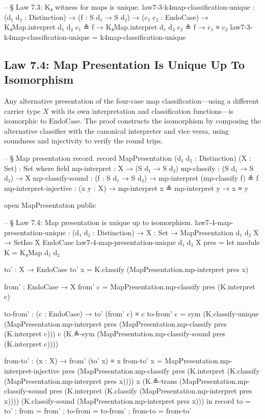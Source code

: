 \documentclass[11pt,a4paper]{book}
\def\texttt#1{#1}%
\begin{document}
\begin{code}
-- § Law 7.3: K₄ witness for maps is unique.
law7-3-k4map-classification-unique :
  (d₁ d₂ : Distinction) →
  (f : S d₁ → S d₂) →
  (c₁ c₂ : EndoCase) →
  K₄Map.interpret d₁ d₂ c₁ ≗ f →
  K₄Map.interpret d₁ d₂ c₂ ≗ f →
  c₁ ≡ c₂
law7-3-k4map-classification-unique = k4map-classification-unique
\end{code}

\subsection{Law 7.4: Map Presentation Is Unique Up To Isomorphism}

Any alternative presentation of the four-case map classification—using a different carrier type $X$ with its own interpretation and classification functions—is isomorphic to \texttt{EndoCase}. The proof constructs the isomorphism by composing the alternative classifier with the canonical interpreter and vice versa, using soundness and injectivity to verify the round trips.

\begin{code}
-- § Map presentation record.
record MapPresentation (d₁ d₂ : Distinction) (X : Set) : Set where
  field
    mp-interpret            : X → (S d₁ → S d₂)
    mp-classify             : (S d₁ → S d₂) → X
    mp-classify-sound       : (f : S d₁ → S d₂) → mp-interpret (mp-classify f) ≗ f
    mp-interpret-injective  : (x y : X) → mp-interpret x ≗ mp-interpret y → x ≡ y

open MapPresentation public

-- § Law 7.4: Map presentation is unique up to isomorphism.
law7-4-map-presentation-unique :
  (d₁ d₂ : Distinction) →
  {X : Set} →
  MapPresentation d₁ d₂ X →
  SetIso X EndoCase
law7-4-map-presentation-unique d₁ d₂ {X} pres =
  let
    module K = K₄Map d₁ d₂

    to' : X → EndoCase
    to' x = K.classify (MapPresentation.mp-interpret pres x)

    from' : EndoCase → X
    from' c = MapPresentation.mp-classify pres (K.interpret c)

    to-from' : (c : EndoCase) → to' (from' c) ≡ c
    to-from' c =
      sym
        (K.classify-unique
          (MapPresentation.mp-interpret pres (MapPresentation.mp-classify pres (K.interpret c)))
          c
          (K.≗-sym (MapPresentation.mp-classify-sound pres (K.interpret c))))

    from-to' : (x : X) → from' (to' x) ≡ x
    from-to' x =
      MapPresentation.mp-interpret-injective pres
        (MapPresentation.mp-classify pres (K.interpret (K.classify (MapPresentation.mp-interpret pres x))))
        x
        (K.≗-trans
          (MapPresentation.mp-classify-sound pres (K.interpret (K.classify (MapPresentation.mp-interpret pres x))))
          (K.classify-sound (MapPresentation.mp-interpret pres x)))
  in
  record
    { to = to'
    ; from = from'
    ; to-from = to-from'
    ; from-to = from-to'
    }
\end{code}
\end{document}
